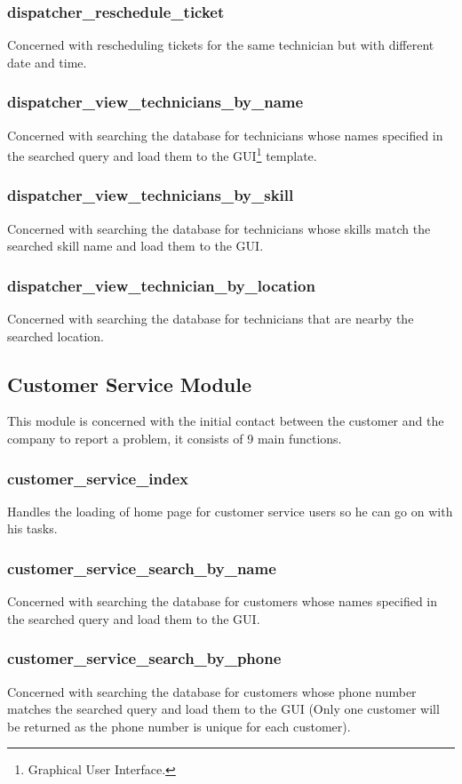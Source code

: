 	\subsubsection{dispatcher\_reschedule\_ticket}
		 Concerned with rescheduling tickets for the same technician but with different date and time.
	\subsubsection{dispatcher\_view\_technicians\_by\_name}
		Concerned with searching the database for technicians whose names specified in the searched query and load them to the GUI\footnote{Graphical User Interface.} template.
	\subsubsection{dispatcher\_view\_technicians\_by\_skill}
		Concerned with searching the database for technicians whose skills match the searched skill name and load them to the GUI.
	\subsubsection{dispatcher\_view\_technician\_by\_location}
		Concerned with searching the database for technicians that are nearby the searched location.
		
\subsection{Customer Service Module}
	This module is concerned with the initial contact between the customer and the company to report a problem, it consists of 9 main functions.
	\subsubsection{customer\_service\_index}
		Handles the loading of home page for customer service users so he can go on with his tasks.
	\subsubsection{customer\_service\_search\_by\_name}
		Concerned with searching the database for customers whose names specified in the searched query and load them to the GUI.
	\subsubsection{customer\_service\_search\_by\_phone}
		Concerned with searching the database for customers whose phone number matches the searched query and load them to the GUI (Only one customer will be returned as the phone number is unique for each customer).
